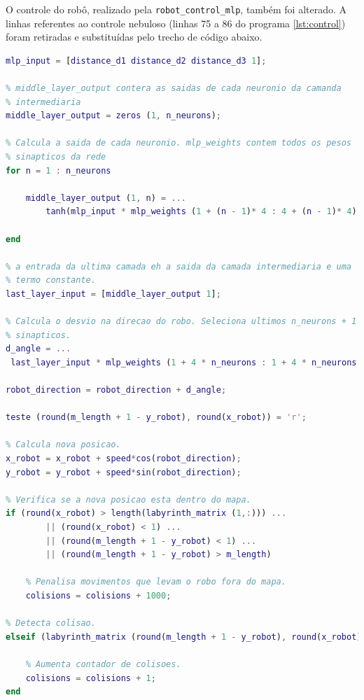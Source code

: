 	O controle do robô, realizado pela \texttt{robot\_control\_mlp}, também foi
	alterado. A linhas referentes ao controle nebuloso (linhas 75 a 86 do programa
	\ref{lst:control}) foram retiradas e substituídas pelo trecho de código abaixo.
	
\begin{lstlisting}[language=Matlab, caption={Trecho de código do controle do
robô feito via rede MLP.}, label={lst:control_mlp}] 
% Constroi vetor das entradas de cada neuronio
mlp_input = [distance_d1 distance_d2 distance_d3 1];

% middle_layer_output contera as saidas de cada neuronio da camanda
% intermediaria
middle_layer_output = zeros (1, n_neurons);

% Calcula a saida de cada neuronio. mlp_weights contem todos os pesos
% sinapticos da rede 
for n = 1 : n_neurons
    
    middle_layer_output (1, n) = ...
        tanh(mlp_input * mlp_weights (1 + (n - 1)* 4 : 4 + (n - 1)* 4)');
    
end

% a entrada da ultima camada eh a saida da camada intermediaria e uma
% termo constante.
last_layer_input = [middle_layer_output 1];

% Calcula o desvio na direcao do robo. Seleciona ultimos n_neurons + 1 pesos
% sinapticos. 
d_angle = ...
 last_layer_input * mlp_weights (1 + 4 * n_neurons : 1 + 4 * n_neurons + n_neurons)';

robot_direction = robot_direction + d_angle;

teste (round(m_length + 1 - y_robot), round(x_robot)) = 'r';

% Calcula nova posicao.
x_robot = x_robot + speed*cos(robot_direction);
y_robot = y_robot + speed*sin(robot_direction);

% Verifica se a nova posicao esta dentro do mapa.
if (round(x_robot) > length(labyrinth_matrix (1,:))) ...
        || (round(x_robot) < 1) ...
        || (round(m_length + 1 - y_robot) < 1) ...
        || (round(m_length + 1 - y_robot) > m_length)
    
    % Penalisa movimentos que levam o robo fora do mapa.
    colisions = colisions + 1000;
    
% Detecta colisao.
elseif (labyrinth_matrix (round(m_length + 1 - y_robot), round(x_robot)) == '#')
    
    % Aumenta contador de colisoes.
    colisions = colisions + 1;
end
\end{lstlisting}
	
